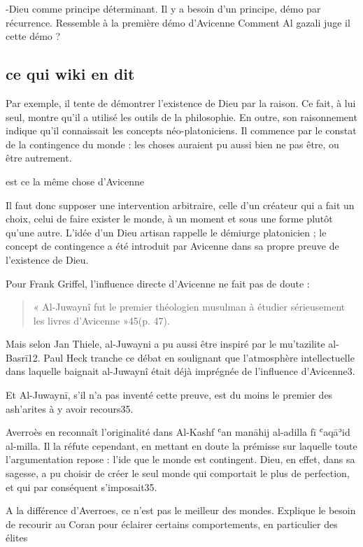  
 \begin{Synthesis}
 -Dieu comme principe déterminant. Il y a besoin d'un principe, démo par récurrence. Ressemble à la première démo d'Avicenne
 Comment Al gazali juge il cette démo ? 
 \end{Synthesis}



\subsection{ce qui wiki en dit}
Par exemple, il tente de démontrer l'existence de Dieu par la raison. Ce fait, à lui seul, montre qu'il a utilisé les outils de la philosophie. En outre, son raisonnement indique qu'il connaissait les concepts néo-platoniciens. Il commence par le constat de la contingence du monde : les choses auraient pu aussi bien ne pas être, ou être autrement. 
\begin{Synthesis}
 est ce la même chose d'Avicenne
\end{Synthesis}

Il faut donc supposer une intervention arbitraire, celle d'un créateur qui a fait un choix, celui de faire exister le monde, à un moment et sous une forme plutôt qu'une autre. L'idée d'un Dieu artisan rappelle le démiurge platonicien ; le concept de contingence a été introduit par Avicenne dans sa propre preuve de l'existence de Dieu. 


Pour Frank Griffel, l'influence directe d'Avicenne ne fait pas de doute : 
\begin{quote}
    « Al-Juwaynî fut le premier théologien musulman à étudier sérieusement les livres d'Avicenne »45(p. 47).
\end{quote} 
Mais selon Jan Thiele, al-Juwayni a pu aussi être inspiré par le mu'tazilite al-Basrī12. Paul Heck tranche ce débat en soulignant que l'atmosphère intellectuelle dans laquelle baignait al-Juwaynî était déjà imprégnée de l'influence d'Avicenne3. 
\begin{Synthesis}
Et Al-Juwaynī, s'il n'a pas inventé cette preuve, est du moins le premier des ash'arites à y avoir recours35.
\end{Synthesis}


Averroès en reconnaît l'originalité dans Al-Kashf ʿan manāhij al-adilla fī ʿaqāʾid al-milla. Il la réfute cependant, en mettant en doute la prémisse sur laquelle toute l'argumentation repose : l'ide que le monde est contingent. Dieu, en effet, dans sa sagesse, a pu choisir de créer le seul monde qui comportait le plus de perfection, et qui par conséquent s'imposait35.
\begin{Synthesis}
A la différence d'Averroes, ce n'est pas le meilleur des mondes. Explique le besoin de recourir au Coran pour éclairer certains comportements, en particulier des élites
\end{Synthesis}



